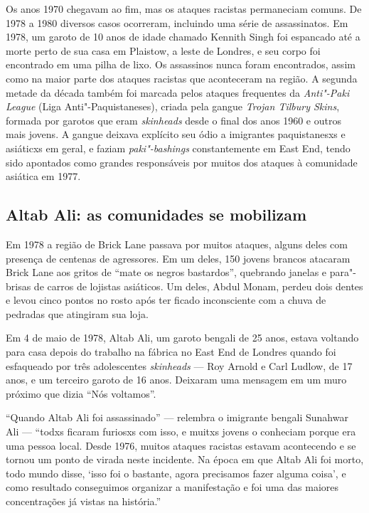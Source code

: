 Os anos 1970 chegavam ao fim, mas os ataques racistas permaneciam comuns. De 1978 a 1980 diversos casos ocorreram, incluindo uma série de assassinatos. Em 1978, um garoto de 10 anos de idade chamado Kennith Singh foi espancado até a morte perto de sua casa em Plaistow, a leste de Londres, e seu corpo foi encontrado em uma pilha de lixo. Os assassinos nunca foram encontrados, assim como na maior parte dos ataques racistas que aconteceram na região. A segunda metade da década também foi marcada pelos ataques frequentes da \emph{Anti"-Paki League} (Liga Anti"-Paquistaneses), criada pela gangue \emph{Trojan Tilbury Skins}, formada por garotos que eram \emph{skinheads} desde o final dos anos 1960 e outros mais jovens. A gangue deixava explícito seu ódio a imigrantes paquistanesxs e asiáticxs em geral, e faziam \emph{paki"-bashings} constantemente em East End, tendo sido apontados como grandes responsáveis por muitos dos ataques à comunidade asiática em 1977.


\subsection{Altab Ali: as comunidades se mobilizam}

Em 1978 a região de Brick Lane passava por muitos ataques, alguns deles com presença de centenas de agressores. Em um deles, 150 jovens brancos atacaram Brick Lane aos gritos de ``mate os negros bastardos'', quebrando janelas e para"-brisas de carros de lojistas asiáticos. Um deles, Abdul Monam, perdeu dois dentes e levou cinco pontos no rosto após ter ficado inconsciente com a chuva de pedradas que atingiram sua loja.

Em 4 de maio de 1978, Altab Ali, um garoto bengali de 25 anos, estava voltando para casa depois do trabalho na fábrica no East End de Londres quando foi esfaqueado por três adolescentes \emph{skinheads} --- Roy Arnold e Carl Ludlow, de 17 anos, e um terceiro garoto de 16 anos. Deixaram uma mensagem em um muro próximo que dizia ``Nós voltamos''.

``Quando Altab Ali foi assassinado'' --- relembra o imigrante bengali Sunahwar Ali --- ``todxs ficaram furiosxs com isso, e muitxs jovens o conheciam porque era uma pessoa local. Desde 1976, muitos ataques racistas estavam acontecendo e se tornou um ponto de virada neste incidente. Na época em que Altab Ali foi morto, todo mundo disse, `isso foi o bastante, agora precisamos fazer alguma coisa', e como resultado conseguimos organizar a manifestação e foi uma das maiores concentrações já vistas na história.''

